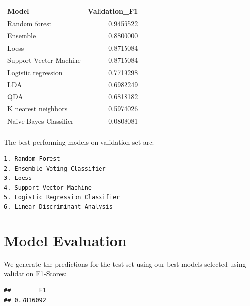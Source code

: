 \documentclass[
]{article}
\newenvironment{Shaded}{\begin{snugshade}}{\end{snugshade}}
\newcommand{\CommentTok}[1]{\textcolor[rgb]{0.00,0.40,1.00}{\textbf{\textit{#1}}}}
\newcommand{\DataTypeTok}[1]{\textcolor[rgb]{0.74,0.68,0.62}{\underline{#1}}}
\newcommand{\KeywordTok}[1]{\textcolor[rgb]{0.26,0.66,0.93}{\textbf{#1}}}
\newcommand{\NormalTok}[1]{\textcolor[rgb]{0.74,0.68,0.62}{#1}}
\newcommand{\OperatorTok}[1]{\textcolor[rgb]{0.74,0.68,0.62}{#1}}
\newcommand{\StringTok}[1]{\textcolor[rgb]{0.02,0.61,0.04}{#1}}
\begin{document}
\begin{longtable}[]{@{}lr@{}}
\toprule
Model & Validation\_F1\tabularnewline
\midrule
\endhead
Random forest & 0.9456522\tabularnewline
Ensemble & 0.8800000\tabularnewline
Loess & 0.8715084\tabularnewline
Support Vector Machine & 0.8715084\tabularnewline
Logistic regression & 0.7719298\tabularnewline
LDA & 0.6982249\tabularnewline
QDA & 0.6818182\tabularnewline
K nearest neighbors & 0.5974026\tabularnewline
Naive Bayes Classifier & 0.0808081\tabularnewline
\pagebreak &\tabularnewline
\bottomrule
\end{longtable}

The best performing models on validation set are:

\begin{verbatim}
1. Random Forest
2. Ensemble Voting Classifier
3. Loess 
4. Support Vector Machine
5. Logistic Regression Classifier
6. Linear Discriminant Analysis 
\end{verbatim}

\hypertarget{model-evaluation}{%
\section{Model Evaluation}\label{model-evaluation}}

We generate the predictions for the test set using our best models
selected using validation F1-Scores:

\begin{Shaded}
\end{Shaded}

\begin{verbatim}
##        F1 
## 0.7816092
\end{verbatim}
\end{document}

